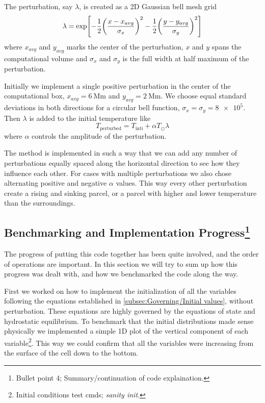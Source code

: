 \documentclass[11pt,a4paper,twocolumn,titlepage]{article}
\newcommand{\half}
{
\frac{1}{2}
}
\begin{document}
The perturbation, say $\lambda$, is created as a 2D Gaussian bell mesh grid
\begin{equation}
\lambda = \exp[-\half \qty(\frac{x-x_{avg}}{\sigma_x})^2 -\half \qty(\frac{y-y_{avg}}{\sigma_y})^2]
\label{eq:Gaussian bell}
\end{equation}
where $x_{avg}$ and $y_{avg}$ marks the center of the perturbation, $x$ and $y$ spans the computational volume and $\sigma_x$ and $\sigma_y$ is the full width at half maximum of the perturbation.

Initially we implement a single positive perturbation in the center of the computational box, $x_{avg}=\SI{6}{\mega\m}$ and $y_{avg}=\SI{2}{\mega\m}$. We choose equal standard deviations in both directions for a circular bell function, $\sigma_x=\sigma_y=\num{8e5}$. Then $\lambda$ is added to the initial temperature like
\begin{equation*}
T_\text{perturbed} =T_\text{inti} + \alpha T_\odot \lambda
\end{equation*}
where $\alpha$ controls the amplitude of the perturbation.


The method is implemented in such a way that we can add any number of perturbations equally spaced along the horizontal direction to see how they influence each other. For cases with multiple perturbations we also chose alternating positive and negative $\alpha$ values. This way every other perturbation create a rising and sinking parcel, or a parcel with higher and lower temperature than the surroundings.

\subsection[Benchmarking and Implementation Progress]{Benchmarking and Implementation Progress\protect\footnote{Bullet point 4; Summary/continuation of code explaination.}}\label{subsec:Method/Benchmarks}
The progress of putting this code together has been quite involved, and the order of operations are important. In this section we will try to sum up how this progress was dealt with, and how we benchmarked the code along the way.

First we worked on how to implement the initialization of all the variables following the equations established in \cref{subsec:Governing/Initial values}, without perturbation. These equations are highly governed by the equations of state and hydrostatic equilibrium. To benchmark that the initial distributions made sense physically we implemented a simple 1D plot of the vertical component of each variable\footnote{Initial conditions test cmds; \textit{sanity init}.}. This way we could confirm that all the variables were increasing from the surface of the cell down to the bottom.
\end{document}
